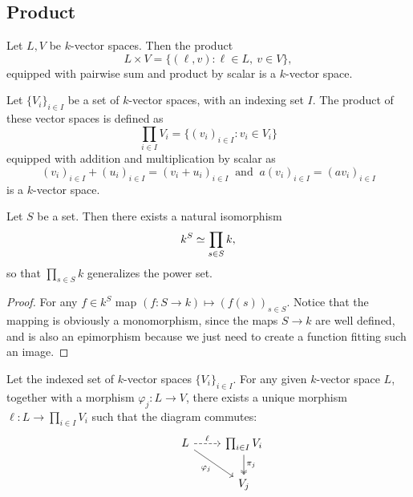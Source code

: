 \subsection{Product}

\begin{definition}
   Let \(L, V\) be \(k\)-vector spaces. Then the product
   \[
      L \times V = \{(\ell, v) : \ell \in L,\ v \in V\},
   \]
   equipped with pairwise sum and product by scalar is a \(k\)-vector space.
\end{definition}

\begin{definition}
   Let \(\{V_i\}_{i \in I}\) be a set of \(k\)-vector spaces, with an indexing
   set \(I\). The product of these vector spaces is defined as
   \[
      \prod_{i \in I} V_i = \{(v_i)_{i \in I} : v_i \in V_i\}
   \]
   equipped with addition and multiplication by scalar as
   \[
      (v_i)_{i \in I} + (u_i)_{i \in I} = (v_i + u_i)_{i \in I}\ \text{ and }\
      a(v_i)_{i \in I} = (av_i)_{i \in I}
   \]
   is a \(k\)-vector space.
\end{definition}

\begin{proposition}
   Let \(S\) be a set. Then there exists a natural isomorphism
   \[
      k^S \simeq \prod_{s \in S} k,
   \]
   so that \(\prod_{s \in S} k\) generalizes the power set.
\end{proposition}

\begin{proof}
   For any \(f \in k^S\) map \((f : S \to k) \mapsto (f(s))_{s \in S}\). Notice
   that the mapping is obviously a monomorphism, since the maps \(S \to k\) are
   well defined, and is also an epimorphism because we just need to create
   a function fitting such an image.
\end{proof}

\begin{proposition}
   Let the indexed set of \(k\)-vector spaces \(\{V_i\}_{i \in I}\). For any
   given \(k\)-vector space \(L\), together with a morphism \(\varphi_j : L \to
   V\), there exists a unique morphism \(\ell : L \to \prod_{i \in I} V_i\) such
   that the diagram commutes:
   \[
      \begin{tikzcd}
         &L
         \ar[r, dashed, "\ell"]
         \ar[dr, swap, "\varphi_j"]
           &\prod_{i \in I} V_i
           \ar[d, "\pi_j", two heads] \\
         &
           &V_j
      \end{tikzcd}
   \]
\end{proposition}

